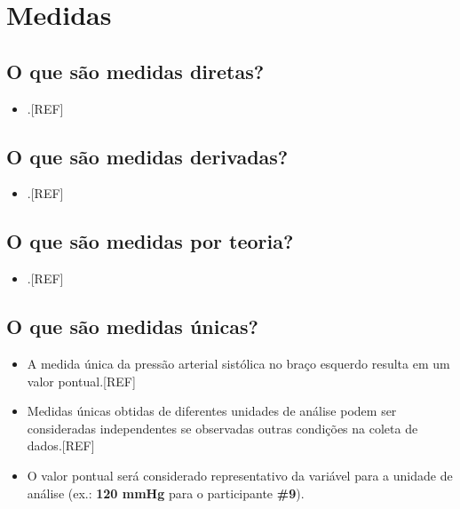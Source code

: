 \documentclass[
  a4paper,
]{book}
\providecommand{\tightlist}{%
  \setlength{\itemsep}{0pt}\setlength{\parskip}{0pt}}
\begin{document}
\hypertarget{medidas}{%
\section{Medidas}\label{medidas}}

\hypertarget{o-que-suxe3o-medidas-diretas}{%
\subsection{O que são medidas diretas?}\label{o-que-suxe3o-medidas-diretas}}

\begin{itemize}
\tightlist
\item
  .{[}REF{]}
\end{itemize}

\hypertarget{o-que-suxe3o-medidas-derivadas}{%
\subsection{O que são medidas derivadas?}\label{o-que-suxe3o-medidas-derivadas}}

\begin{itemize}
\tightlist
\item
  .{[}REF{]}
\end{itemize}

\hypertarget{o-que-suxe3o-medidas-por-teoria}{%
\subsection{O que são medidas por teoria?}\label{o-que-suxe3o-medidas-por-teoria}}

\begin{itemize}
\tightlist
\item
  .{[}REF{]}
\end{itemize}

\hypertarget{o-que-suxe3o-medidas-uxfanicas}{%
\subsection{O que são medidas únicas?}\label{o-que-suxe3o-medidas-uxfanicas}}

\begin{itemize}
\item
  A medida única da pressão arterial sistólica no braço esquerdo resulta em um valor pontual.{[}REF{]}
\item
  Medidas únicas obtidas de diferentes unidades de análise podem ser consideradas independentes se observadas outras condições na coleta de dados.{[}REF{]}
\item
  O valor pontual será considerado representativo da variável para a unidade de análise (ex.: \textbf{120 mmHg} para o participante \textbf{\#9}).
\end{itemize}
\end{document}
